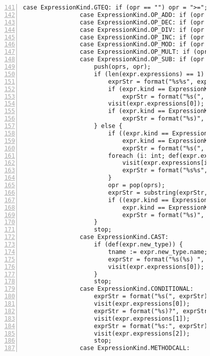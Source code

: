 \begin{figure}[ht!]
\begin{lstlisting}[numbers=left, tabsize=4, escapechar=@, caption={API Usage Mining Analysis},label={lst:aun-code},  firstline = 141, firstnumber = 141, lastline = 201]
                case ExpressionKind.GTEQ: if (opr == "") opr = ">=";
                case ExpressionKind.OP_ADD: if (opr == "") opr = "+";
                case ExpressionKind.OP_DEC: if (opr == "") opr = "--";
                case ExpressionKind.OP_DIV: if (opr == "") opr = "/"; 
                case ExpressionKind.OP_INC: if (opr == "") opr = "++"; 
                case ExpressionKind.OP_MOD: if (opr == "") opr = "%"; 
                case ExpressionKind.OP_MULT: if (opr == "") opr = "*";
                case ExpressionKind.OP_SUB: if (opr == "") opr = "-";
                    push(oprs, opr);
                    if (len(expr.expressions) == 1) {
                        exprStr = format("%s%s", exprStr, pop(oprs));
                        if (expr.kind == ExpressionKind.LOGICAL_NOT)
                            exprStr = format("%s(", exprStr);
                        visit(expr.expressions[0]);
                        if (expr.kind == ExpressionKind.LOGICAL_NOT)
                            exprStr = format("%s)", exprStr);
                    } else {
                        if ((expr.kind == ExpressionKind.ASSIGN && isPP) ||
                            expr.kind == ExpressionKind.LOGICAL_NOT) 
                            exprStr = format("%s(", exprStr);
                        foreach (i: int; def(expr.expressions[i])) {
                            visit(expr.expressions[i]);
                            exprStr = format("%s%s", exprStr, peek(oprs));
                        }
                        opr = pop(oprs);
                        exprStr = substring(exprStr, 0, (len(exprStr)-len(opr)));
                        if ((expr.kind == ExpressionKind.ASSIGN && isPP) ||
                            expr.kind == ExpressionKind.LOGICAL_NOT) 
                            exprStr = format("%s)", exprStr);
                    }
		            stop;
                case ExpressionKind.CAST:
                    if (def(expr.new_type)) {
                        tname := expr.new_type.name;
                        exprStr = format("%s(%s) ", exprStr, tname);
                        visit(expr.expressions[0]); 
                    }
                    stop;
                case ExpressionKind.CONDITIONAL:
                    exprStr = format("%s(", exprStr);
                    visit(expr.expressions[0]);
                    exprStr = format("%s)?", exprStr);
                    visit(expr.expressions[1]);
                    exprStr = format("%s:", exprStr);
                    visit(expr.expressions[2]);
                    stop;
                case ExpressionKind.METHODCALL:

\end{lstlisting}
\end{figure}
